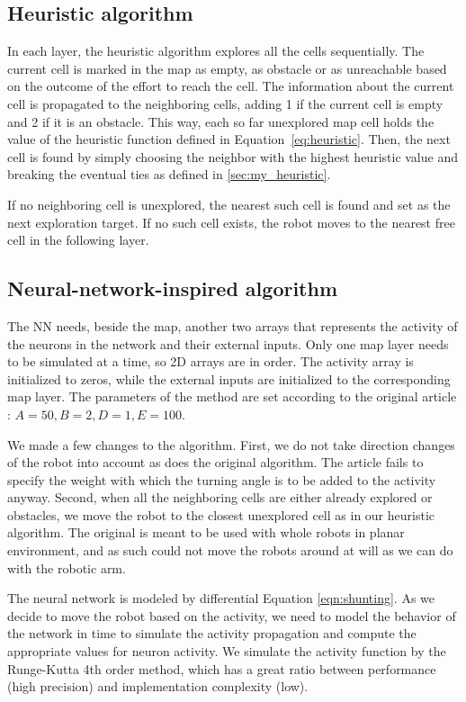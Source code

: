 \documentclass[buriama8_dp.tex]{subfiles}
\begin{document}
\subsection{Heuristic algorithm}
\label{subsec:impl_heur}

In each layer, the heuristic algorithm explores all the cells sequentially. The current cell is marked in the map as empty, as obstacle or as unreachable based on the outcome of the effort to reach the cell. The information about the current cell is propagated to the neighboring cells, adding 1 if the current cell is empty and 2 if it is an obstacle. This way, each so far unexplored map cell holds the value of the heuristic function defined in Equation~\ref{eq:heuristic}. Then, the next cell is found by simply choosing the neighbor with the highest heuristic value and breaking the eventual ties as defined in \ref{sec:my_heuristic}.

If no neighboring cell is unexplored, the nearest such cell is found and set as the next exploration target. If no such cell exists, the robot moves to the nearest free cell in the following layer.

\subsection{Neural-network-inspired algorithm}
\label{subsec:impl_neuro}

The NN needs, beside the map, another two arrays that represents the activity of the neurons in the network and their external inputs. Only one map layer needs to be simulated at a time, so 2D arrays are in order. The activity array is initialized to zeros, while the external inputs are initialized to the corresponding map layer. The parameters of the method are set according to the original article \cite{neural}: \(A=50, B=2, D=1, E=100\).

We made a few changes to the algorithm. First, we do not take direction changes of the robot into account as does the original algorithm. The article fails to specify the weight with which the turning angle is to be added to the activity anyway. Second, when all the neighboring cells are either already explored or obstacles, we move the robot to the closest unexplored cell as in our heuristic algorithm. The original is meant to be used with whole robots in planar environment, and as such could not move the robots around at will as we can do with the robotic arm.

The neural network is modeled by differential Equation \ref{eqn:shunting}. As we decide to move the robot based on the activity, we need to model the behavior of the network in time to simulate the activity propagation and compute the appropriate values for neuron activity. We simulate the activity function by the Runge-Kutta 4th order method, which has a great ratio between performance (high precision) and implementation complexity (low).
\end{document}
